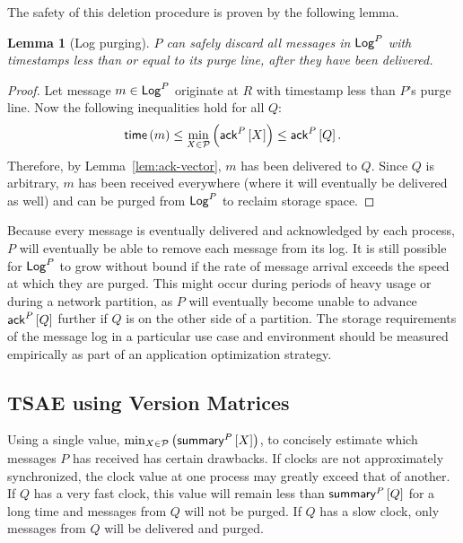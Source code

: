 \documentclass[]             %
{NASA}                       %
\newtheorem{lemma}[theorem]{Lemma}
\theoremstyle{definition}
\begin{document}
The safety of this deletion procedure is proven by the following
lemma.
\begin{lemma}[Log purging]
  \label{lem:purge}
  $P$ can safely discard all messages in $\mathsf{Log}^{P}$ with timestamps less
  than or equal to its purge line, after they have been delivered.
\end{lemma}
\begin{proof}
  Let message $m \in \mathsf{Log}^{P}$ originate at $R$ with timestamp less than
  $P$'s purge line. Now the following inequalities hold for all $Q$:
  \[ \mathsf{time}\left(m\right) \leq \min_{X \in \mathcal{P}}\left(\mathsf{ack}^{P}\left[X\right]\right)
    \leq \mathsf{ack}^{P}\left[Q\right].\] Therefore, by Lemma~\ref{lem:ack-vector}, $m$
  has been delivered to $Q$. Since $Q$ is arbitrary, $m$ has been
  received everywhere (where it will eventually be delivered as well)
  and can be purged from $\mathsf{Log}^{P}$ to reclaim storage space.
\end{proof}

Because every message is eventually delivered and acknowledged by each
process, $P$ will eventually be able to remove each message from its
log. It is still possible for $\mathsf{Log}^{P}$ to grow without bound if the
rate of message arrival exceeds the speed at which they are
purged. This might occur during periods of heavy usage or during a
network partition, as $P$ will eventually become unable to advance
$\mathsf{ack}^{P}\left[Q\right]$ further if $Q$ is on the other side of a partition. The
storage requirements of the message log in a particular use case and
environment should be measured empirically as part of an application
optimization strategy.

\subsection{TSAE using Version Matrices}
\label{ssec:tsae-unsynchronized}
Using a single value,
$\min_{X \in \mathcal{P}} \left(\mathsf{summary}^{P}\left[X\right]\right)$, to concisely
estimate which messages $P$ has received has certain drawbacks. If
clocks are not approximately synchronized, the clock value at one
process may greatly exceed that of another. If $Q$ has a very fast
clock, this value will remain less than $\mathsf{summary}^{P}\left[Q\right]$ for a long
time and messages from $Q$ will not be purged. If $Q$ has a slow
clock, only messages from $Q$ will be delivered and purged.
\end{document}
